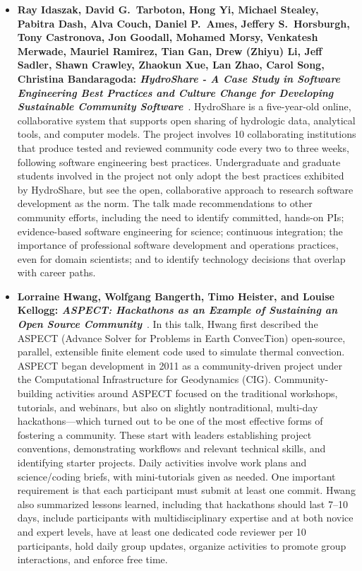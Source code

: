 \documentclass[11pt, oneside]{amsart}
\begin{document}
\begin{itemize}[itemsep=1ex]
    \item \textbf{Ray Idaszak\textsuperscript{\textasteriskcentered},
    David G.~Tarboton, Hong Yi, Michael Stealey,
    Pabitra Dash, Alva Couch, Daniel P.~Ames, Jeffery S.~Horsburgh, Tony Castronova,
    Jon Goodall, Mohamed Morsy, Venkatesh Merwade, Mauriel Ramirez, Tian Gan,
    Drew (Zhiyu) Li, Jeff Sadler, Shawn Crawley, Zhaokun Xue, Lan Zhao, Carol Song,
    Christina Bandaragoda: \emph{HydroShare - A Case Study in Software Engineering
    Best Practices and Culture Change for Developing Sustainable Community
    Software}}~\cite{Idaszak:2016ws}.
    HydroShare is a five-year-old online, collaborative system that supports
    open sharing of hydrologic data, analytical tools, and computer models. The
    project involves 10 collaborating institutions that produce tested and reviewed
    community code every two to three weeks, following software engineering best
    practices. Undergraduate and graduate students involved in the project not
    only adopt the best practices exhibited by HydroShare, but see the open,
    collaborative approach to research software development as the norm.
    The talk made recommendations to other community efforts, including the need to
    identify committed, hands-on PIs; evidence-based software engineering for science;
    continuous integration; the importance of professional software development and
    operations practices, even for domain scientists; and to identify technology
    decisions that overlap with career paths.

    \item \textbf{Lorraine Hwang\textsuperscript{\textasteriskcentered},
    Wolfgang Bangerth, Timo Heister, and Louise Kellogg:
    \emph{ASPECT: Hackathons as an Example of Sustaining an Open Source
    Community}}~\cite{Hwang:2016ws}.
    In this talk, Hwang first described the ASPECT (Advance Solver for Problems in
    Earth ConvecTion) open-source, parallel, extensible finite element code
    used to simulate thermal convection. ASPECT began development in 2011 as a
    community-driven project under the Computational Infrastructure for Geodynamics
    (CIG). Community-building activities around ASPECT focused on the traditional
    workshops, tutorials, and webinars, but also on slightly nontraditional,
    multi-day hackathons---which turned out to be one of the most effective
    forms of fostering a community. These start with leaders establishing project
    conventions, demonstrating workflows and relevant technical skills, and
    identifying starter projects. Daily activities involve work plans and
    science\slash coding briefs, with mini-tutorials given as needed. One important
    requirement is that each participant must submit at least one commit. Hwang
    also summarized lessons learned, including that hackathons should last 7--10
    days, include participants with multidisciplinary expertise and at both novice
    and expert levels, have at least one dedicated code reviewer per 10 participants,
    hold daily group updates, organize activities to promote group interactions,
    and enforce free time.


\end{itemize}
\end{document}
